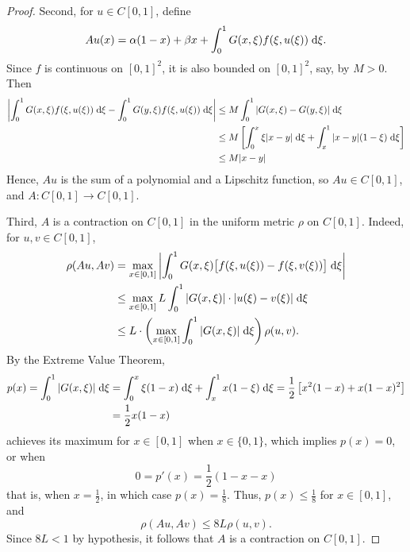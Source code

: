 \documentclass{homework}
\begin{document}
\begin{enumerate}[label=\textbf{(\roman*)}]
\begin{proof}
			Second, for $u\in C[0,1]$, define
			\begin{equation}
				Au(x) = \alpha(1-x) + \beta x + \int_0^1G(x,\xi)f(\xi, u(\xi))\;\text{d}\xi.
			\end{equation}
			Since $f$ is continuous on $[0,1]^2$, it is also bounded on $[0,1]^2$, say, by $M > 0$. Then
			\begin{align*}
				\left|\int_0^1 G(x,\xi)f(\xi, u(\xi))\;\text{d}\xi - \int_0^1G(y,\xi)f(\xi,u(\xi))\;\text{d}\xi\right| &\le M \int_0^1|G(x,\xi) - G(y,\xi)|\;\text{d}\xi \\
				&\le M\left[\int_0^x  \xi|x-y|\;\text{d}\xi + \int_x^1 |x-y|(1-\xi)\;\text{d}\xi\right] \\
				&\le M |x-y|
			\end{align*}
			Hence, $Au$ is the sum of a polynomial and a Lipschitz function, so $Au \in C[0,1]$, and $A : C[0,1] \to C[0,1]$.
			
			Third, $A$ is a contraction on $C[0,1]$ in the uniform metric $\rho$ on $C[0,1]$. Indeed, for $u, v \in C[0,1]$,
			\begin{align}
				\rho(Au,Av) &= \max_{x\in[0,1]}\left|\int_0^1G(x,\xi)\big[f(\xi, u(\xi))-f(\xi,v(\xi))\big]\;\text{d}\xi\right| \\
				&\le \max_{x\in[0,1]} L\int_0^1|G(x,\xi)| \cdot|u(\xi) - v(\xi)|\;\text{d}\xi \\
				&\le L \cdot\left(\max_{x\in[0,1]}\int_0^1 |G(x,\xi)|\;\text{d}\xi\right)\rho(u,v).
			\end{align}
			By the Extreme Value Theorem,
			\begin{equation}
				\begin{aligned}
					p(x) = \int_0^1|G(x,\xi)|\;\text{d}\xi &= \int_0^x \xi(1-x)\;\text{d}\xi + \int_x^1x(1-\xi)\;\text{d}\xi = \frac{1}{2}\left[x^2(1-x) + x(1-x)^2\right] \\
					&= \frac{1}{2}x(1-x)
				\end{aligned}
			\end{equation}
			achieves its maximum for $x \in [0,1]$ when $x \in \{0,1\}$, which implies $p(x) = 0$, or when 
			\begin{equation}
				0 = p'(x) = \frac{1}{2}(1-x - x)
			\end{equation}
			that is, when $x = \frac{1}{2}$, in which case $p(x) = \frac{1}{8}$. Thus, $p(x) \le \frac{1}{8}$ for $x \in [0,1]$, and
			\begin{equation}
				\rho(Au,Av) \le 8L \rho(u,v).
			\end{equation}
			Since $8L < 1$ by hypothesis, it follows that $A$ is a contraction on $C[0,1]$.
			

\end{proof}
\end{enumerate}
\end{document}
